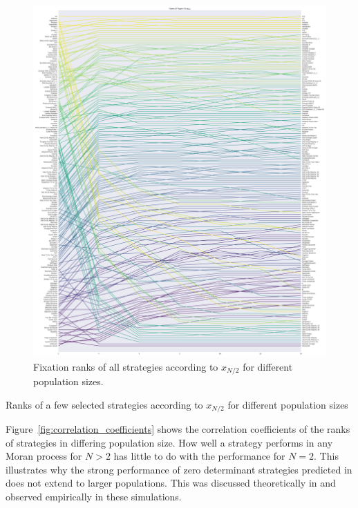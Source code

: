 \documentclass[10pt,journal]{IEEEtran}
\begin{document}
\begin{figure}[!hbtp]
    \centering
    \includegraphics[width=\columnwidth]{img/average_rank_vs_population_size_coexist.pdf}
    \caption{Fixation ranks of all strategies according to \(x_{N/2}\) for different
    population sizes.}
    \label{fig:ranks_v_size_coexist}
\end{figure}

\begin{table}[!hbtp]
    \centering
    \scriptsize
    
    \caption{Ranks of a few selected strategies according to \(x_{N/2}\) for different
    population sizes}
    \label{tbl:ranks_v_size_coexist}
\end{table}


Figure~\ref{fig:correlation_coefficients} shows the correlation coefficients
of the ranks of strategies in differing population size. How well a strategy
performs in any Moran process for \(N>2\) has
little to do with the performance for \(N=2\). This illustrates why the strong
performance of zero determinant strategies predicted in \cite{Press2012} does
not extend to larger populations. This was discussed theoretically in
\cite{Adami2013} and observed empirically in these simulations.
\end{document}
